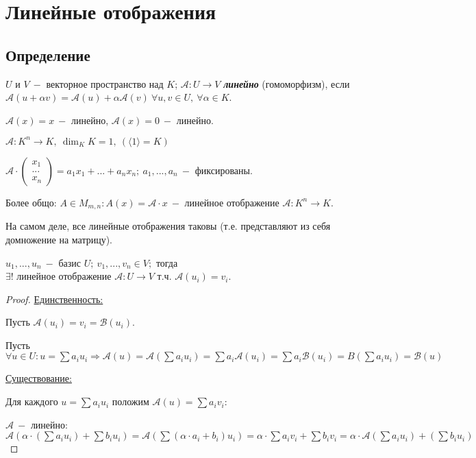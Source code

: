 \section{Линейные отображения}

\subsection{Определение}

\begin{definition}
    $U$ и $V\ -$ векторное пространство над $K$; $\mathcal{A}:U\rightarrow 
V$  \textbf{\textit{линейно}} (гомоморфизм), если $\mathcal{A}(u+\alpha 
v)=\mathcal{A}(u)+\alpha \mathcal{A}(v)\ \forall u,v\in U,\ \forall \alpha 
\in K$.
\end{definition}

\begin{example}
    $\mathcal{A}(x)=x\ -$ линейно, $\mathcal{A}(x)=0\ -$ линейно.
\end{example}

\begin{example}
    $\mathcal{A}:K^n\rightarrow K,\ \dim_K K=1,\ (\langle1\rangle=K)$

    $\mathcal{A}\cdot 
\begin{pmatrix}x_1\\...\\x_n\end{pmatrix}=a_1x_1+...+a_nx_n;\ a_1,...,a_n\ 
-$ фиксированы.

    Более общо: $A\in M_{m,n}:A(x)=\mathcal{A}\cdot x\ -$ линейное 
отображение $\mathcal{A}:K^n\rightarrow K$.
\end{example}

\begin{remark}
    На самом деле, все линейные отображения таковы (т.е. представляют из 
себя домножение на матрицу).
\end{remark}

\begin{theorem}
    $u_1,...,u_n\ -$ базис $U;\ v_1,...,v_n\in V;$  тогда $\exists !\text{ 
линейное отображение }\mathcal{A}:U\rightarrow V \text{ т.ч. } 
\mathcal{A}(u_i)=v_i$.
\end{theorem} 

\begin{proof}
    \underline{Единственность:}    

    Пусть $\mathcal{A}(u_i)=v_i=\mathcal{B}(u_i)$.

    Пусть $\forall u\in U: u=\sum a_iu_i\Rightarrow 
\mathcal{A}(u)=\mathcal{A}(\sum a_iu_i)=\sum a_i\mathcal{A}(u_i)=\sum 
a_i\mathcal{B}(u_i)=B(\sum a_iu_i)=\mathcal{B}(u)$

    \underline{Существование:}

    Для каждого $u=\sum a_iu_i$ положим $\mathcal{A}(u)=\sum a_iv_i$:

    $\mathcal{A}\ -$ линейно: $\mathcal{A}(\alpha\cdot (\sum a_iu_i)+\sum 
b_iu_i)=\mathcal{A}(\sum(\alpha\cdot a_i+b_i)u_i)=\alpha\cdot \sum 
a_iv_i+\sum b_iv_i=\alpha \cdot \mathcal{A}(\sum a_iu_i)+(\sum b_iu_i)$
\end{proof}

